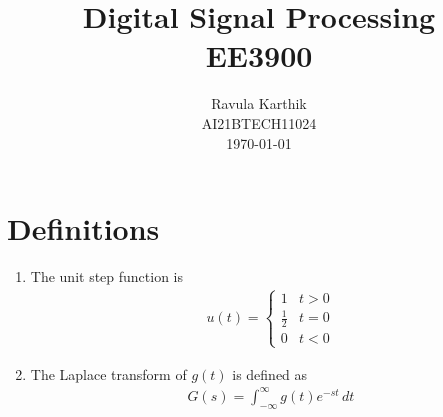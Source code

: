 \documentclass[journal,12pt,twocolumn]{IEEEtran}
\numberwithin{equation}{section}
\renewcommand\thesection{\arabic{section}}
\begin{document}
	
	\title{ Digital Signal Processing  \\ 
		\Large EE3900
	}
	\author{Ravula Karthik \\ \normalsize AI21BTECH11024 \\ \vspace*{20pt} \normalsize \today  }
	\maketitle 
	\tableofcontents
	\section{Definitions}
	\begin{enumerate}[label=\arabic*.,ref=\thesection.\theenumi]
		\item The unit step function is 
		\begin{align}
			\label{eq:unit-step}
			u(t) =
			\begin{cases}
				1 & t > 0
				\\
				\frac{1}{2} & t = 0
				\\
				0 & t < 0
			\end{cases}
		\end{align}
		\item The Laplace transform of $g(t)$ is defined as 
		\begin{align}
			G(s) = \int_{-\infty}^{\infty} g(t) e^{-st}\, dt
		\end{align}
	\end{enumerate}
	
\end{document}
